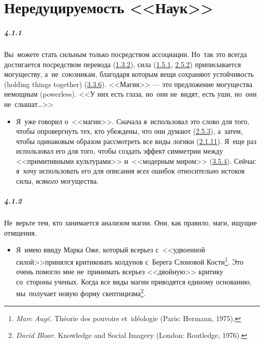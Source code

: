 \chapter{Нередуцируемость <<Наук>>}


\paragraph{4.1.1}\hypertarget{par:4.1.1}{} Вы~можете стать сильным только посредством ассоциации. Но~так это всегда достигается посредством перевода (\hyperlink{par:1.3.2}{1.3.2}), сила (\hyperlink{par:1.5.1}{1.5.1}, \hyperlink{par:2.5.2}{2.5.2}) приписывается могуществу, а~не~союзникам, благодаря которым вещи сохраняют устойчивость (holding things together) (\hyperlink{par:3.3.6}{3.3.6}). <<Магия>> --- это предложение могущества немощным (powerless). <<У них есть глаза, но~они не~видят, есть уши, но~они не~слышат{\ldots}>>
	\begin{itemize}
	\item 
 Я~уже говорил о~<<магии>>. Сначала я~использовал это слово для того, чтобы опровергнуть тех, кто убеждены, что они думают (\hyperlink{par:2.5.3}{2.5.3}), а~затем, чтобы одинаковым образом рассмотреть все виды логики (\hyperlink{par:2.1.11}{2.1.11}). Я~еще раз использовал его для того, чтобы создать эффект симметрии между <<примитивными культурами>> и~<<модерным миром>> (\hyperlink{par:3.5.4}{3.5.4}). Сейчас я~хочу использовать его для описания {\itshape всех} ошибок относительно истоков силы, {\itshape всякого} могущества.
	\end{itemize}	


\paragraph{4.1.2}\hypertarget{par:4.1.2}{} Не~верьте тем, кто занимается анализом магии. Они, как правило, маги, ищущие отмщения.
	\begin{itemize}
	\item 
 Я~имею ввиду Марка Оже, который всерьез с~<<удвоенной силой>>принялся критиковать колдунов с~Берега Слоновой Кости\footnote{{\itshape Marc Aug\'{e}.} Th\'{e}orie des pouvoirs et~id\'{e}ologie (Paris: Hermann, 1975).}. Это очень помогло мне не~принимать всерьез <<двойную>> критику со~стороны ученых. Когда все виды магии приводятся единому основанию, мы~получает новую форму скептицизма\footnote{{\itshape David Bloor}. Knowledge and Social Imagery (London: Routledge, 1976).}.
	\end{itemize}	

